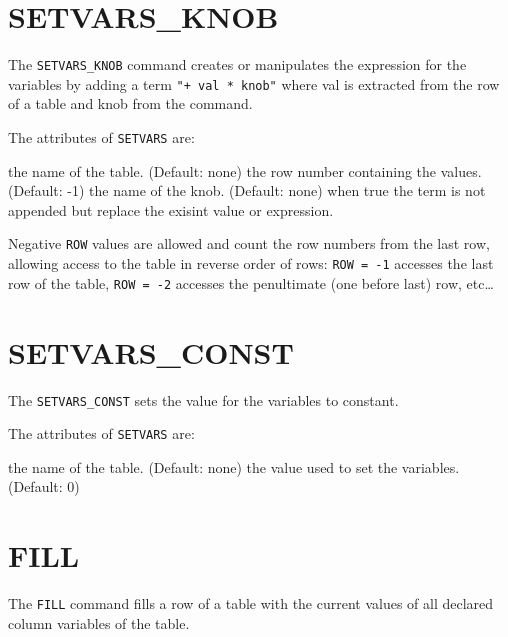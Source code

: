 \section{SETVARS\_KNOB}
\label{sec:setvars-knob}

The \texttt{SETVARS\_KNOB} command creates or manipulates the expression for the variables by adding a term \texttt{"+ val * knob"} where val is  extracted from the row of a table and knob from the command.


The attributes of \texttt{SETVARS} are:
\begin{madlist}
   the name of the table. (Default: none)
   the row number containing the values. (Default: -1)
   the name of the knob. (Default: none)
   when true the term is not appended but replace the exisint value or expression.
\end{madlist}

Negative \texttt{ROW} values are allowed and count the row numbers from
the last row, allowing access to the table in reverse order of rows:
\texttt{ROW~=~-1} accesses the last row of the table,
\texttt{ROW~=~-2} accesses the penultimate (one before last) row,
etc\ldots  


\section{SETVARS\_CONST}
\label{sec:setvars-const}

The \texttt{SETVARS\_CONST} sets the value for the variables to constant.


The attributes of \texttt{SETVARS} are:
\begin{madlist}
	 the name of the table. (Default: none)
	 the value used to set the variables. (Default: 0)
\end{madlist}

\section{FILL} 
\label{sec:fill}
The \texttt{FILL} command fills a row of a table with the current values 
of all declared column variables of the table.


